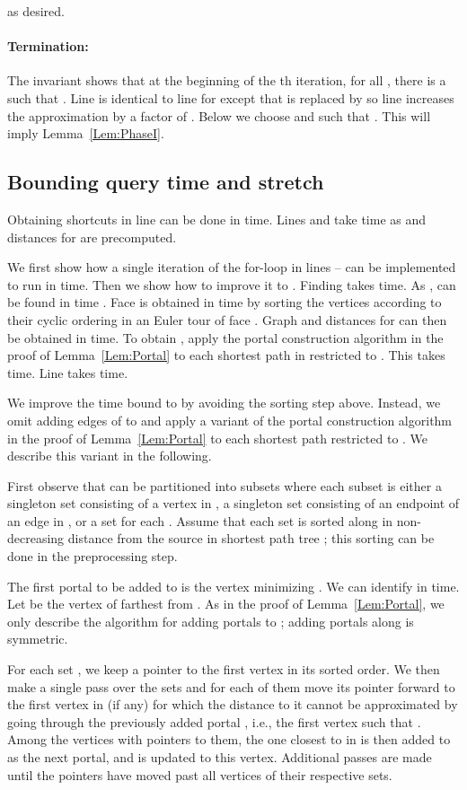 \documentclass[11pt]{article}
\begin{document}
as desired.

\paragraph{Termination:} The invariant shows that at the beginning of the th iteration, for all , there is a  such that . Line  is identical to line  for  except that  is replaced by  so line  increases the approximation by a factor of . Below we choose  and  such that . This will imply Lemma~\ref{Lem:PhaseI}.



\subsection{Bounding query time and stretch}\label{subsec:TimeStretch}
Obtaining shortcuts in line  can be done in  time. Lines  and  take  time as  and distances  for  are precomputed.

We first show how a single iteration  of the for-loop in lines -- can be implemented to run in  time. Then we show how to improve it to . Finding  takes  time. As ,  can be found in time . Face  is obtained in  time by sorting the vertices according to their cyclic ordering in an Euler tour of face . Graph  and distances  for  can then be obtained in  time. To obtain , apply the portal construction algorithm in the proof of Lemma~\ref{Lem:Portal} to each shortest path in  restricted to . This takes  time. Line  takes  time.

We improve the time bound to  by avoiding the sorting step above. Instead, we omit adding edges of  to  and apply a variant of the portal construction algorithm in the proof of Lemma~\ref{Lem:Portal} to each shortest path  restricted to . We describe this variant in the following.

First observe that  can be partitioned into  subsets  where each subset  is either a singleton set consisting of a vertex in , a singleton set consisting of an endpoint of an edge in , or a set  for each . Assume that each set  is sorted along  in non-decreasing distance from the source  in shortest path tree ; this sorting can be done in the preprocessing step.

The first portal  to be added to  is the vertex  minimizing . We can identify  in  time. Let  be the vertex of  farthest from . As in the proof of Lemma~\ref{Lem:Portal}, we only describe the algorithm for adding portals to ; adding portals along  is symmetric.

For each set , we keep a pointer to the first vertex in its sorted order. We then make a single pass over the sets  and for each of them move its pointer forward to the first vertex in  (if any) for which the distance to it cannot be approximated by going through the previously added portal , i.e., the first vertex  such that . Among the vertices with pointers to them, the one closest to  in  is then added to  as the next portal, and  is updated to this vertex. Additional passes are made until the pointers have moved past all vertices of their respective  sets.
\end{document}
